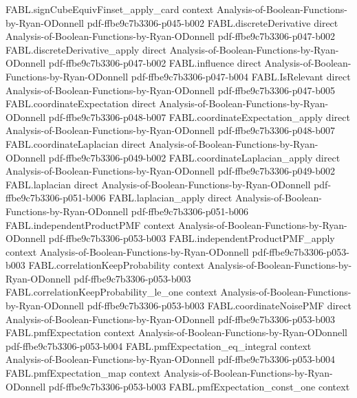 \begin{theorem}
  {FABL.signCubeEquivFinset_apply_card}
  {context}
  {Analysis-of-Boolean-Functions-by-Ryan-ODonnell}
  {pdf-ffbe9c7b3306-p045-b002}
\proofstep
  {FABL.discreteDerivative}
  {direct}
  {Analysis-of-Boolean-Functions-by-Ryan-ODonnell}
  {pdf-ffbe9c7b3306-p047-b002}
\proofstep
  {FABL.discreteDerivative_apply}
  {direct}
  {Analysis-of-Boolean-Functions-by-Ryan-ODonnell}
  {pdf-ffbe9c7b3306-p047-b002}
\proofstep
  {FABL.influence}
  {direct}
  {Analysis-of-Boolean-Functions-by-Ryan-ODonnell}
  {pdf-ffbe9c7b3306-p047-b004}
\proofstep
  {FABL.IsRelevant}
  {direct}
  {Analysis-of-Boolean-Functions-by-Ryan-ODonnell}
  {pdf-ffbe9c7b3306-p047-b005}
\proofstep
  {FABL.coordinateExpectation}
  {direct}
  {Analysis-of-Boolean-Functions-by-Ryan-ODonnell}
  {pdf-ffbe9c7b3306-p048-b007}
\proofstep
  {FABL.coordinateExpectation_apply}
  {direct}
  {Analysis-of-Boolean-Functions-by-Ryan-ODonnell}
  {pdf-ffbe9c7b3306-p048-b007}
\proofstep
  {FABL.coordinateLaplacian}
  {direct}
  {Analysis-of-Boolean-Functions-by-Ryan-ODonnell}
  {pdf-ffbe9c7b3306-p049-b002}
\proofstep
  {FABL.coordinateLaplacian_apply}
  {direct}
  {Analysis-of-Boolean-Functions-by-Ryan-ODonnell}
  {pdf-ffbe9c7b3306-p049-b002}
\proofstep
  {FABL.laplacian}
  {direct}
  {Analysis-of-Boolean-Functions-by-Ryan-ODonnell}
  {pdf-ffbe9c7b3306-p051-b006}
\proofstep
  {FABL.laplacian_apply}
  {direct}
  {Analysis-of-Boolean-Functions-by-Ryan-ODonnell}
  {pdf-ffbe9c7b3306-p051-b006}
\proofstep
  {FABL.independentProductPMF}
  {context}
  {Analysis-of-Boolean-Functions-by-Ryan-ODonnell}
  {pdf-ffbe9c7b3306-p053-b003}
\proofstep
  {FABL.independentProductPMF_apply}
  {context}
  {Analysis-of-Boolean-Functions-by-Ryan-ODonnell}
  {pdf-ffbe9c7b3306-p053-b003}
\proofstep
  {FABL.correlationKeepProbability}
  {context}
  {Analysis-of-Boolean-Functions-by-Ryan-ODonnell}
  {pdf-ffbe9c7b3306-p053-b003}
\proofstep
  {FABL.correlationKeepProbability_le_one}
  {context}
  {Analysis-of-Boolean-Functions-by-Ryan-ODonnell}
  {pdf-ffbe9c7b3306-p053-b003}
\proofstep
  {FABL.coordinateNoisePMF}
  {direct}
  {Analysis-of-Boolean-Functions-by-Ryan-ODonnell}
  {pdf-ffbe9c7b3306-p053-b003}
\proofstep
  {FABL.pmfExpectation}
  {context}
  {Analysis-of-Boolean-Functions-by-Ryan-ODonnell}
  {pdf-ffbe9c7b3306-p053-b004}
\proofstep
  {FABL.pmfExpectation_eq_integral}
  {context}
  {Analysis-of-Boolean-Functions-by-Ryan-ODonnell}
  {pdf-ffbe9c7b3306-p053-b004}
\proofstep
  {FABL.pmfExpectation_map}
  {context}
  {Analysis-of-Boolean-Functions-by-Ryan-ODonnell}
  {pdf-ffbe9c7b3306-p053-b003}
\proofstep
  {FABL.pmfExpectation_const_one}
  {context}

\end{theorem}
